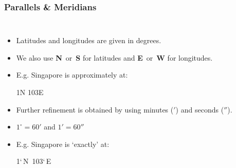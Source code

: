 \begin{frame}
\frametitle{Parallels \& Meridians}
\begin{columns}
	\begin{itemize}
		\item Latitudes and longitudes are given in degrees.
		\item We also use \textbf{N}~or~\textbf{S} for latitudes and \textbf{E}~or~\textbf{W} for longitudes.
		\item E.g. Singapore is approximately at:
		\begin{center}
			1\degree N 103\degree E
		\end{center}
		\item Further refinement is obtained by using minutes ($'$) and seconds ($''$).
		\item $1^{\circ} = 60'$ and $1' = 60''$
		\item E.g. Singapore is `exactly' at:
		\begin{center}
			1`\,N~103`\,E
		\end{center}
	\end{itemize}

	\bigskip

\end{columns}
\end{frame}

